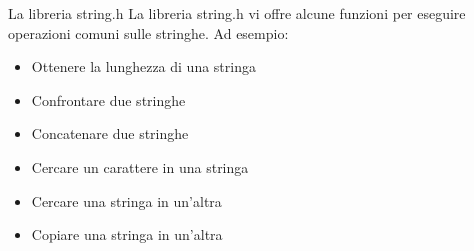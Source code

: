 \documentclass[aspectratio=169, ]{beamer}
\begin{document}






%

\begin{frame}{La libreria string.h}
La libreria string.h vi offre alcune funzioni per eseguire operazioni comuni sulle stringhe. Ad esempio:
\begin{itemize}
	\item Ottenere la lunghezza di una stringa
	\item Confrontare due stringhe
	\item Concatenare due stringhe
	\item Cercare un carattere in una stringa
	\item Cercare una stringa in un'altra
	\item Copiare una stringa in un'altra
\end{itemize}
\end{frame}
\end{document}
